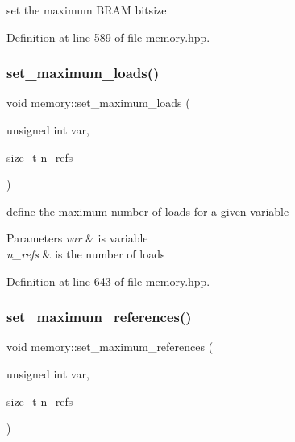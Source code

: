 set the maximum B\+R\+AM bitsize 



Definition at line 589 of file memory.\+hpp.

\mbox{\label{classmemory_a093f5c9909afd59a4ce3e480934fbfb4}} 
\subsubsection{\texorpdfstring{set\+\_\+maximum\+\_\+loads()}{set\_maximum\_loads()}}
{\footnotesize\ttfamily void memory\+::set\+\_\+maximum\+\_\+loads (\begin{DoxyParamCaption}\item[{unsigned int}]{var,  }\item[{\hyperlink{tutorial__fpt__2017_2intro_2sixth_2test_8c_a7c94ea6f8948649f8d181ae55911eeaf}{size\+\_\+t}}]{n\+\_\+refs }\end{DoxyParamCaption})\hspace{0.3cm}{\ttfamily [inline]}}



define the maximum number of loads for a given variable 


\begin{DoxyParams}{Parameters}
{\em var} & is variable \\
\hline
{\em n\+\_\+refs} & is the number of loads \\
\hline
\end{DoxyParams}


Definition at line 643 of file memory.\+hpp.

\mbox{\label{classmemory_aae0ad53726eef6b63a98acb7096c3418}} 
\subsubsection{\texorpdfstring{set\+\_\+maximum\+\_\+references()}{set\_maximum\_references()}}
{\footnotesize\ttfamily void memory\+::set\+\_\+maximum\+\_\+references (\begin{DoxyParamCaption}\item[{unsigned int}]{var,  }\item[{\hyperlink{tutorial__fpt__2017_2intro_2sixth_2test_8c_a7c94ea6f8948649f8d181ae55911eeaf}{size\+\_\+t}}]{n\+\_\+refs }\end{DoxyParamCaption})\hspace{0.3cm}{\ttfamily [inline]}}



